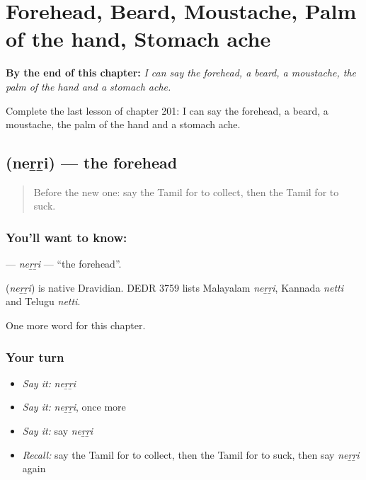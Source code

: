 
\chapter{Forehead, Beard, Moustache, Palm of the hand, Stomach ache}
\label{ch:ta-forehead-beard-moustache-palm-of-the-hand-stomach-ache}

\begin{chapteropening}
\textbf{By the end of this chapter:} \emph{I can say the forehead, a beard, a moustache, the palm of the hand and a stomach ache.}

Complete the last lesson of chapter 201: I can say the forehead, a beard, a moustache, the palm of the hand and a stomach ache.
\end{chapteropening}

\section[\texorpdfstring{\ta{நெற்றி} (neṟṟi)}{நெற்றி (neṟṟi)}]{ (neṟṟi) — the forehead}

\label{lesson:TA-C201-nerri}



\begin{quote}
Before the new one: say the Tamil for to collect, then the Tamil for to suck.
\end{quote}

\subsection*{You'll want to know: }
\textbf{} — \emph{neṟṟi} — \textquotedblleft{}the forehead\textquotedblright{}.

\begin{cousinweb}
\textbf{} (\emph{neṟṟi}) is native Dravidian. DEDR 3759 lists Malayalam \emph{neṟṟi}, Kannada \emph{netti} and Telugu \emph{netti}.
\end{cousinweb}

\begin{grammarlens}[title={What you've built}]
One more word for this chapter.
\end{grammarlens}

\subsection*{Your turn}
\begin{itemize}
\raggedright
  \item \emph{Say it:} \emph{neṟṟi}
  \item \emph{Say it:} \emph{neṟṟi}, once more
  \item \emph{Say it:} say \emph{neṟṟi}
  \item \emph{Recall:} say the Tamil for to collect, then the Tamil for to suck, then say \emph{neṟṟi} again
\end{itemize}

